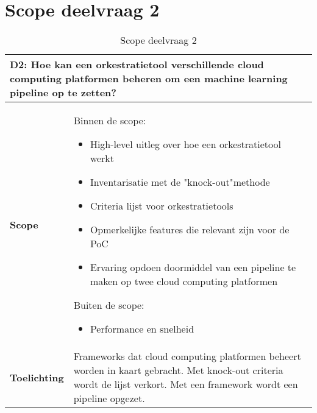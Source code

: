 \section{Scope deelvraag 2}\label{appendix:scope-subquestion-2}
\begin{table}[hbt!]
  \centering
  \begin{tabular}{|p{.215\linewidth}|p{.72\linewidth}|}
  \hline
  \multicolumn{2}{|p{.97\linewidth}|}{\textbf{D2: Hoe kan een orkestratietool verschillende cloud computing platformen beheren om een machine learning pipeline op te zetten?}} \\ \hline
    \textbf{Scope}&
      Binnen de scope:
      \begin{itemize}
        \item High-level uitleg over hoe een orkestratietool werkt
        \item Inventarisatie met de "knock-out"\space methode
        \item Criteria lijst voor orkestratietools
        \item Opmerkelijke features die relevant zijn voor de PoC
        \item Ervaring opdoen doormiddel van een pipeline te maken op twee cloud computing platformen
      \end{itemize}
      Buiten de scope:
      \begin{itemize}
        \item Performance en snelheid
      \end{itemize}
    \\ \hline
    \textbf{Toelichting}&
      Frameworks dat cloud computing platformen beheert worden in kaart gebracht. Met knock-out criteria wordt de lijst verkort. Met een framework wordt een pipeline opgezet.
    \\ \hline
  \end{tabular}
  \caption{Scope deelvraag 2}
  \label{table:scope-subquestion-2}
  \end{table}

